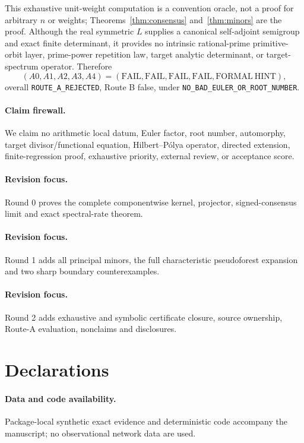 \documentclass[9pt]{extarticle}
\begin{document}
This exhaustive unit-weight computation is a convention oracle, not a proof
for arbitrary $n$ or weights; Theorems~\ref{thm:consensus} and~\ref{thm:minors}
are the proof.  Although the real symmetric $L$ supplies a canonical
self-adjoint semigroup and exact finite determinant, it provides no intrinsic
rational-prime primitive-orbit layer, prime-power repetition law, target
analytic determinant, or target-spectrum operator.  Therefore
\[
 (A0,A1,A2,A3,A4)=(\mathrm{FAIL},\mathrm{FAIL},\mathrm{FAIL},
 \mathrm{FAIL},\mathrm{FORMAL\ HINT}),
\]
overall \texttt{ROUTE\_A\_REJECTED}, Route B false, under
\texttt{NO\_BAD\_EULER\_OR\_ROOT\_NUMBER}.

\paragraph{Claim firewall.}
We claim no arithmetic local datum, Euler factor, root number, automorphy,
target divisor/functional equation, Hilbert--P\'olya operator, directed
extension, finite-regression proof, exhaustive priority, external review, or
acceptance score.
\fi

\ifcase\CRevisionRound
\paragraph{Revision focus.} Round 0 proves the complete componentwise kernel,
projector, signed-consensus limit and exact spectral-rate theorem.
\or
\paragraph{Revision focus.} Round 1 adds all principal minors, the full
characteristic pseudoforest expansion and two sharp boundary counterexamples.
\or
\paragraph{Revision focus.} Round 2 adds exhaustive and symbolic certificate
closure, source ownership, Route-A evaluation, nonclaims and disclosures.
\fi

\section*{Declarations}
\paragraph{Data and code availability.} Package-local synthetic exact evidence
and deterministic code accompany the manuscript; no observational network data
are used.
\end{document}
